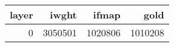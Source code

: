 \begin{tabular}{rrrr}
\toprule
 layer &   iwght &   ifmap &    gold \\
\midrule
     0 & 3050501 & 1020806 & 1010208 \\
\bottomrule
\end{tabular}
